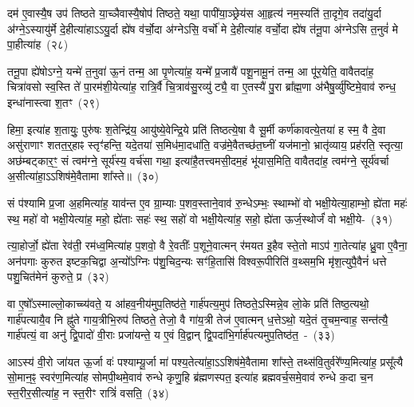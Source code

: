 दम॑ ए॒वास्यै॒ष उप॑ तिष्ठते या॒च्ञैवास्यै॒षोप॑ तिष्ठते॒ यथा॒ पापी॑या॒ञ्छ्रेय॑स आ॒हृत्य॑ नम॒स्यति॑ ता॒दृगे॒व तदा॑यु॒र्दा अ॑ग्ने॒\-ऽस्यायु॑र्मे दे॒हीत्या॑हा\-ऽ\-ऽयु॒र्दा ह्ये॑ष व॑र्चो॒दा अ॑ग्ने\-ऽसि॒ वर्चो॑ मे दे॒हीत्या॑ह वर्चो॒दा ह्ये॑ष त॑नू॒पा अ॑ग्ने\-ऽसि त॒नुवं॑ मे पा॒हीत्या॑ह~(२८)

तनू॒पा ह्ये॑षो\-ऽग्ने॒ यन्मे॑ त॒नुवा॑ ऊ॒नं तन्म॒ आ पृ॒णेत्या॑ह॒ यन्मे᳚ प्र॒जायै॑ पशू॒नामू॒नं तन्म॒ आ पू॑र॒येति॒ वावैतदा॑ह॒ चित्रा॑वसो स्व॒स्ति ते॑ पा॒रम॑शी॒येत्या॑ह॒ रात्रि॒र्वै चि॒त्राव॑सु॒रव्यु॑ट्यै॒ वा ए॒तस्यै॑ पु॒रा ब्रा᳚ह्म॒णा अ॑भैषु॒र्व्यु॑ष्टिमे॒वाव॑ रुन्ध॒ इन्धा॑नास्त्वा श॒तꣳ~(२९)

हिमा॒ इत्या॑ह श॒तायुः॒ पुरु॑षः श॒तेन्द्रि॑य॒ आयु॑ष्ये॒वेन्द्रि॒ये प्रति॑ तिष्ठत्ये॒षा वै सू॒र्मी कर्ण॑कावत्ये॒तया॑ ह स्म॒ वै दे॒वा असु॑राणाꣳ शतत॒र्॒\mbox{}हाꣴ स्तृꣳ॑हन्ति॒ यदे॒तया॑ स॒मिध॑मा॒दधा॑ति॒ वज्र॑मे॒वैतच्छ॑त॒घ्नीं यज॑मानो॒ भ्रातृ॑व्याय॒ प्रह॑रति॒ स्तृत्या॒ अछ॑म्बट्कार॒ꣳ॒ सं त्वम॑ग्ने॒ सूर्य॑स्य॒ वर्च॑सा गथा॒ इत्या॑है॒तत्त्वमसी॒दम॒हं भू॑यास॒मिति॒ वावैतदा॑ह॒ त्वम॑ग्ने॒ सूर्य॑वर्चा अ॒सीत्या॑हा॒\-ऽ\-ऽशिष॑मे॒वैतामा शा᳚स्ते॥~(३०)

{\anuvakamend[{मू॒र्धानं॒ वै तिष्ठ॑त आह श॒तम॒हꣳ षोड॑श च}]}%

सं प॑श्यामि प्र॒जा अ॒हमित्या॑ह॒ याव॑न्त ए॒व ग्रा॒म्याः प॒शव॒स्ताने॒वाव॑ रु॒न्धे\-ऽम्भः॒ स्थाम्भो॑ वो भक्षी॒येत्या॒हाम्भो॒ ह्ये॑ता महः॑ स्थ॒ महो॑ वो भक्षी॒येत्या॑ह॒ महो॒ ह्ये॑ताः सहः॑ स्थ॒ सहो॑ वो भक्षी॒येत्या॑ह॒ सहो॒ ह्ये॑ता ऊर्ज॒स्थोर्जं॑ वो भक्षी॒ये-~(३१)

त्या॒होर्जो॒ ह्ये॑ता रेव॑ती॒ रम॑ध्व॒मित्या॑ह प॒शवो॒ वै रे॒वतीः᳚ प॒शूने॒वात्मन् र॑मयत इ॒हैव स्ते॒तो मा\-ऽप॑ गा॒तेत्या॑ह ध्रु॒वा ए॒वैना॒ अन॑पगाः कुरुत इष्टक॒चिद्वा अ॒न्यो᳚\-ऽग्निः प॑शु॒चिद॒न्यः सꣳ॑हि॒तासि॑ विश्वरू॒पीरिति॑ व॒थ्सम॒भि मृ॑श॒त्युपै॒वैनं॑ धत्ते पशु॒चित॑मेनं कुरुते॒ प्र~(३२)

वा ए॒षो᳚\-ऽस्माल्लो॒काच्च्य॑वते॒ य आ॑हव॒नीय॑मुप॒तिष्ठ॑ते॒ गार्\mbox{}ह॑पत्य॒मुप॑ तिष्ठते॒\-ऽस्मिन्ने॒व लो॒के प्रति॑ तिष्ठ॒त्यथो॒ गार्\mbox{}ह॑पत्यायै॒व नि ह्नु॑ते गाय॒त्रीभि॒रुप॑ तिष्ठते॒ तेजो॒ वै गा॑य॒त्री तेज॑ ए॒वात्मन् ध॒त्ते\-ऽथो॒ यदे॒तं तृ॒चम॒न्वाह॒ सन्त॑त्यै॒ गार्\mbox{}ह॑पत्यं॒ वा अनु॑ द्वि॒पादो॑ वी॒राः प्रजा॑यन्ते॒ य ए॒वं वि॒द्वान् द्वि॒पदा॑भि॒र्गार्\mbox{}ह॑पत्यमुप॒तिष्ठ॑त॒~-~(३३)

आ\-ऽस्य॑ वी॒रो जा॑यत ऊ॒र्जा वः॑ पश्याम्यू॒र्जा मा॑ पश्य॒तेत्या॑हा॒\-ऽ\-ऽशिष॑मे॒वैतामा शा᳚स्ते॒ तथ्स॑वि॒तुर्वरे᳚ण्य॒मित्या॑ह॒ प्रसू᳚त्यै सो॒मान॒ꣴ॒ स्वर॑ण॒मित्या॑ह सोमपी॒थमे॒वाव॑ रुन्धे कृणु॒हि ब्र॑ह्मणस्पत॒ इत्या॑ह ब्रह्मवर्च॒समे॒वाव॑ रुन्धे क॒दा च॒न स्त॒रीर॒सीत्या॑ह॒ न स्त॒रीꣳ रात्रिं॑ वसति॒~(३४)

